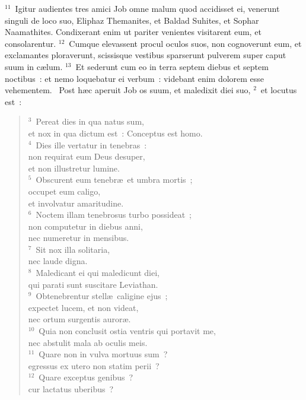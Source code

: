 ${}^{11}$~Igitur audientes tres amici Job omne malum quod accidisset ei, venerunt singuli de loco suo, Eliphaz Themanites, et Baldad Suhites, et Sophar Naamathites. Condixerant enim ut pariter venientes visitarent eum, et consolarentur.
${}^{12}$~Cumque elevassent procul oculos suos, non cognoverunt eum, et exclamantes ploraverunt, scissisque vestibus sparserunt pulverem super caput suum in c\ae lum.
${}^{13}$~Et sederunt cum eo in terra septem diebus et septem noctibus~: et nemo loquebatur ei verbum~: videbant enim dolorem esse vehementem.
~\lettrine[lines=10,image=true,loversize=0.05,lraise=-0.03]{P}{}ost h\ae c aperuit Job os suum, et maledixit diei suo,
${}^{2}$~et locutus est~:
\begin{flushleft}\begin{verse}${}^{3}$~Pereat dies in qua natus sum,\\ et nox in qua dictum est~: Conceptus est homo.\\
${}^{4}$~Dies ille vertatur in tenebras~:\\ non requirat eum Deus desuper,\\ et non illustretur lumine.\\
${}^{5}$~Obscurent eum tenebr\ae\ et umbra mortis~;\\ occupet eum caligo,\\ et involvatur amaritudine.\\
${}^{6}$~Noctem illam tenebrosus turbo possideat~;\\ non computetur in diebus anni,\\ nec numeretur in mensibus.\\
${}^{7}$~Sit nox illa solitaria,\\ nec laude digna.\\
${}^{8}$~Maledicant ei qui maledicunt diei,\\ qui parati sunt suscitare Leviathan.\\
${}^{9}$~Obtenebrentur stell\ae\ caligine ejus~;\\ expectet lucem, et non videat,\\ nec ortum surgentis auror\ae .\\
${}^{10}$~Quia non conclusit ostia ventris qui portavit me,\\ nec abstulit mala ab oculis meis.\\
${}^{11}$~Quare non in vulva mortuus sum~?\\ egressus ex utero non statim perii~?\\
${}^{12}$~Quare exceptus genibus~?\\ cur lactatus uberibus~?\\

\end{verse}
\end{flushleft}
